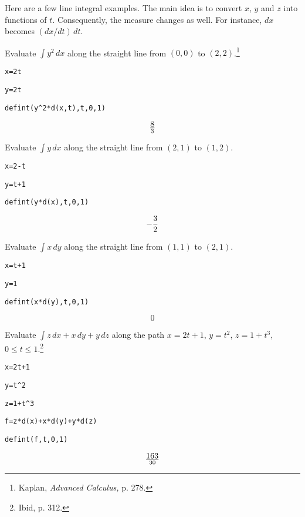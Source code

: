 \newpage

\noindent
Here are a few line integral examples.
The main idea is to convert $x$, $y$ and $z$ into functions of $t$.
Consequently, the measure changes as well.
For instance, $dx$ becomes $(dx/dt)\,dt$.

\medskip
\noindent
Evaluate $\int y^2\,dx$ along the straight
line from $(0,0)$ to $(2,2)$.\footnote{Kaplan,
{\it Advanced Calculus,} p. 278.}

\medskip
\verb$x=2t$

\verb$y=2t$

\verb$defint(y^2*d(x,t),t,0,1)$

$$8\over3$$

\medskip
\noindent
Evaluate $\int y\,dx$ along the straight line from
$(2,1)$ to $(1,2)$.

\medskip
\verb$x=2-t$

\verb$y=t+1$

\verb$defint(y*d(x),t,0,1)$

$$-{3\over2}$$

\medskip
\noindent
Evaluate $\int x\,dy$ along the straight line from
$(1,1)$ to $(2,1)$.

\medskip
\verb$x=t+1$

\verb$y=1$

\verb$defint(x*d(y),t,0,1)$

$$0$$

\medskip
\noindent
Evaluate $\int z\,dx+x\,dy+y\,dz$
along the path
$x=2t+1$, $y=t^2$, $z=1+t^3$, $0\le t\le 1$.\footnote{Ibid, p. 312.}

\medskip
\verb$x=2t+1$

\verb$y=t^2$

\verb$z=1+t^3$

\verb$f=z*d(x)+x*d(y)+y*d(z)$

\verb$defint(f,t,0,1)$

$$163\over30$$

